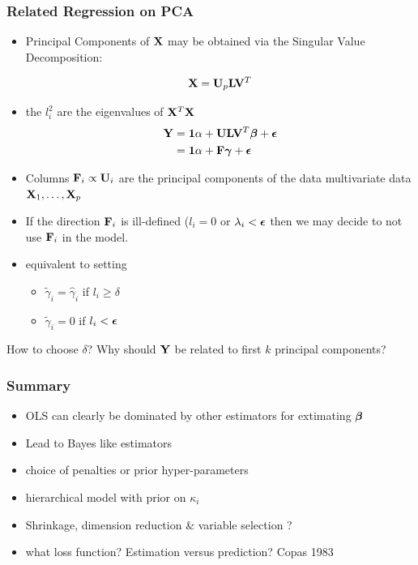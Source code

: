 \documentclass[handout]{beamer}\usepackage[]{graphicx}\usepackage[]{color}
\begin{document}
\begin{frame} \frametitle{Related Regression on PCA}
  \begin{itemize}
  \item
  Principal Components of $\mathbf{X}$ may be obtained via the Singular Value
  Decomposition:

$$\mathbf{X} = \mathbf{U}_p \mathbf{L} \mathbf{V}^T$$
\pause
\item the $l^2_i$ are the eigenvalues of $\mathbf{X}^T\mathbf{X}$ \pause
  \begin{align*}
 \mathbf{Y} & = \mathbf{1} \alpha + \mathbf{U} \mathbf{L} \mathbf{V}^T \boldsymbol{\beta} + \boldsymbol{\epsilon}  \\
    & = \mathbf{1} \alpha + \mathbf{F} \boldsymbol{\gamma} + \boldsymbol{\epsilon} \\
  \end{align*}
\item Columns $\mathbf{F}_i \propto \mathbf{U}_i$ are the principal components of the
  data multivariate data $\mathbf{X}_1, \ldots, \mathbf{X}_p$ \pause
\item If the direction $\mathbf{F}_i$ is ill-defined ($l_i = 0$  or $\lambda_i < \boldsymbol{\epsilon}$
     then we may decide to not use $\mathbf{F}_i$ in the model.  \pause
\item equivalent to setting
  \begin{itemize}
  \item $\tilde{\gamma}_i = \hat{\gamma}_i$ if  $l_i\geq \delta$
  \item $\tilde{\gamma}_i = 0$ if  $l_i < \boldsymbol{\epsilon}$ \pause
  \end{itemize}
  \end{itemize}
How to choose $\delta$?   Why should $\mathbf{Y}$ be related to first $k$
principal components?
\end{frame}
\begin{frame} \frametitle{Summary }

  \begin{itemize}
  \item OLS can clearly be dominated by other estimators for
    extimating $\boldsymbol{\beta}$  \pause
  \item Lead to Bayes like estimators \pause
  \item choice of penalties or prior hyper-parameters \pause
  \item hierarchical model with prior on $\kappa_i$ \pause
  \item Shrinkage, dimension reduction \& variable selection ? \pause
  \item what loss function?  Estimation versus prediction?  Copas 1983
  \end{itemize}

\end{frame}
\end{document}
